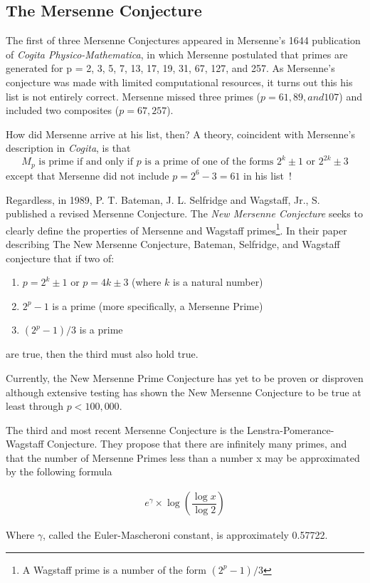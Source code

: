 \subsection{The Mersenne Conjecture}

The first of three Mersenne Conjectures appeared in Mersenne’s 1644 publication of 
\textit{Cogita Physico-Mathematica}, in which Mersenne postulated that primes are generated for p = 2, 3, 5,
7, 13, 17, 19, 31, 67, 127, and 257. As Mersenne's conjecture was made with limited computational
resources, it turns out this his list is not entirely correct.
Mersenne missed three primes ($p = 61, 89, and 107$) and included two composites ($p = 67, 257$).

How did Mersenne arrive at his list, then? A theory, coincident with Mersenne's description in
\textit{Cogita}, is that
\begin{equation}
    M_p \text{ is prime if and only if $p$ is a prime of one of the forms } 2^k\pm1 \text{ or } 2^{2k}\pm3
\end{equation}
except that Mersenne did not include $p = 2^{6}-3 = 61$ in his list~\cite{newconjecture}!

Regardless, in 1989, P. T. Bateman, J. L. Selfridge and Wagstaff, Jr., S. published a revised Mersenne Conjecture.
The \textit{New Mersenne Conjecture} seeks to clearly define the properties of Mersenne and Wagstaff primes\footnote{A Wagstaff prime is a number of the form $(2^p-1)/3$}.
In their paper describing The New Mersenne Conjecture, Bateman, Selfridge, and Wagstaff conjecture that if two of: 
\begin{enumerate}
\item $p = 2^k \pm 1$ or $p = 4k \pm 3$ (where $k$ is a natural number)
\item $2^p - 1$ is a prime (more specifically, a Mersenne Prime)
\item $(2^p - 1)/3$ is a prime
\end{enumerate}
are true, then the third must also hold true.

Currently, the New Mersenne Prime Conjecture has yet to be proven or disproven although extensive testing
has shown the New Mersenne Conjecture to be true at least through $p < 100,000$.

The third and most recent Mersenne Conjecture is the Lenstra-Pomerance-Wagstaff
Conjecture. They propose that there are infinitely many primes, and that the number of
Mersenne Primes less than a number x may be approximated by the following formula~\cite{utm.edu-heuristic}

\begin{align}
e^{\gamma} \times \log \left( \dfrac{\log{x}}{\log{2}} \right)
\end{align}

Where $\gamma$, called the Euler-Mascheroni constant, is approximately 0.57722.
